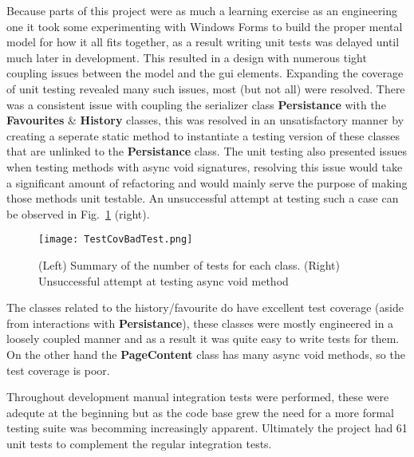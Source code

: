 \documentclass[../Main.tex]{subfiles}
\begin{document}
Because parts of this project were as much a learning exercise as an engineering one it took some experimenting with Windows Forms to build the proper mental model for how it all fits together, as a result writing unit tests was delayed until much later in development. This resulted in a design with numerous tight coupling issues between the model and the gui elements. 
Expanding the coverage of unit testing revealed many such issues, most (but not all) were resolved. 
There was a consistent issue with coupling the serializer class \textbf{Persistance} with the \textbf{Favourites} \& \textbf{History} classes, this was resolved in an unsatisfactory manner by creating a seperate static method to instantiate a testing version of these classes that are unlinked to the \textbf{Persistance} class.
The unit testing also presented issues when testing methods with async void signatures, resolving this issue would take a significant amount of refactoring and would mainly serve the purpose of making those methods unit testable. An unsuccessful attempt at testing such a case can be observed in Fig.~\ref{fig:TestCov} (right).

\begin{figure}[H]
    \begin{center}
        \texttt{[image: TestCovBadTest.png]}
    \end{center}
    \caption{(Left) Summary of the number of tests for each class. (Right) Unsuccessful attempt at testing async void method}
    \label{fig:TestCov}
\end{figure}

The classes related to the history/favourite do have excellent test coverage (aside from interactions with \textbf{Persistance}), these classes were mostly engineered in a loosely coupled manner and as a result it was quite easy to write tests for them. On the other hand the \textbf{PageContent} class has many async void methods, so the test coverage is poor.

Throughout development manual integration tests were performed, these were adequte at the beginning but as the code base grew the need for a more formal testing suite was becomming increasingly apparent. Ultimately the project had 61 unit tests to complement the regular integration tests.
\end{document}
